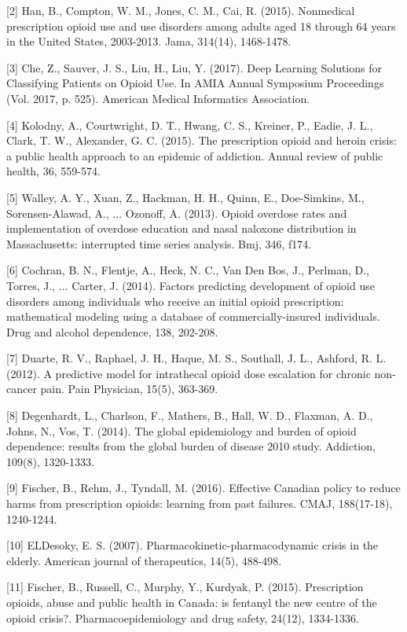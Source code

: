\documentclass{mcmthesis}
\begin{document}
[2] Han, B., Compton, W. M., Jones, C. M., Cai, R. (2015). Nonmedical prescription opioid use and use disorders among adults aged 18 through 64 years in the United States, 2003-2013. Jama, 314(14), 1468-1478.

[3] Che, Z., Sauver, J. S., Liu, H., Liu, Y. (2017). Deep Learning Solutions for Classifying Patients on Opioid Use. In AMIA Annual Symposium Proceedings (Vol. 2017, p. 525). American Medical Informatics Association.

[4] Kolodny, A., Courtwright, D. T., Hwang, C. S., Kreiner, P., Eadie, J. L., Clark, T. W., Alexander, G. C. (2015). The prescription opioid and heroin crisis: a public health approach to an epidemic of addiction. Annual review of public health, 36, 559-574.

[5] Walley, A. Y., Xuan, Z., Hackman, H. H., Quinn, E., Doe-Simkins, M., Sorensen-Alawad, A., ... Ozonoff, A. (2013). Opioid overdose rates and implementation of overdose education and nasal naloxone distribution in Massachusetts: interrupted time series analysis. Bmj, 346, f174.

[6] Cochran, B. N., Flentje, A., Heck, N. C., Van Den Bos, J., Perlman, D., Torres, J., ... Carter, J. (2014). Factors predicting development of opioid use disorders among individuals who receive an initial opioid prescription: mathematical modeling using a database of commercially-insured individuals. Drug and alcohol dependence, 138, 202-208.

[7] Duarte, R. V., Raphael, J. H., Haque, M. S., Southall, J. L., Ashford, R. L. (2012). A predictive model for intrathecal opioid dose escalation for chronic non-cancer pain. Pain Physician, 15(5), 363-369.

[8] Degenhardt, L., Charlson, F., Mathers, B., Hall, W. D., Flaxman, A. D., Johns, N., Vos, T. (2014). The global epidemiology and burden of opioid dependence: results from the global burden of disease 2010 study. Addiction, 109(8), 1320-1333.

[9] Fischer, B., Rehm, J., Tyndall, M. (2016). Effective Canadian policy to reduce harms from prescription opioids: learning from past failures. CMAJ, 188(17-18), 1240-1244.

[10] ELDesoky, E. S. (2007). Pharmacokinetic-pharmacodynamic crisis in the elderly. American journal of therapeutics, 14(5), 488-498.

[11] Fischer, B., Russell, C., Murphy, Y., Kurdyak, P. (2015). Prescription opioids, abuse and public health in Canada: is fentanyl the new centre of the opioid crisis?. Pharmacoepidemiology and drug safety, 24(12), 1334-1336.
\end{document}
